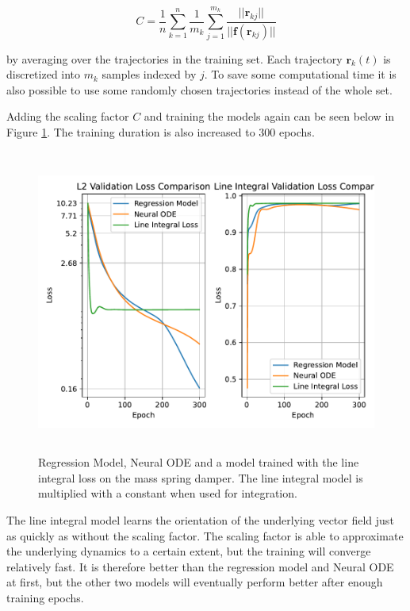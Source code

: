 \documentclass[12pt,a4paper]{book}
\begin{document}
\begin{equation}
    C = \frac{1}{n} \sum_{k=1}^n \frac{1}{m_k} \sum_{j=1}^{m_k} \frac{|| \bm{r}_{k j} ||}{|| \bm{f}(\bm{r}_{k j}) ||}
\end{equation}

\noindent by averaging over the trajectories in the training set. Each trajectory $\bm{r}_k(t)$ is discretized into $m_k$ samples indexed by $j$. To save some computational time it is also possible to use some randomly chosen trajectories instead of the whole set.

Adding the scaling factor $C$ and training the models again can be seen below in Figure \ref{fig:line_integral_comparison_with_k}. The training duration is also increased to 300 epochs.

\begin{figure}[H]
    \centering
    \includegraphics[height=10cm]{figs/plots/motion_classification/line_integral_comparison_with_k.pdf}
    \caption{Regression Model, Neural ODE and a model trained with the line integral loss on the mass spring damper. The line integral model is multiplied with a constant when used for integration.}
    \label{fig:line_integral_comparison_with_k}
\end{figure}

The line integral model learns the orientation of the underlying vector field just as quickly as without the scaling factor. The scaling factor is able to approximate the underlying dynamics to a certain extent, but the training will converge relatively fast. It is therefore better than the regression model and Neural ODE at first, but the other two models will eventually perform better after enough training epochs.
\end{document}
